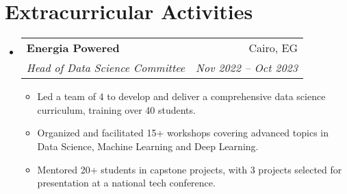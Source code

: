 \documentclass[letterpaper,11pt]{article}
\makeatletter
\newcommand{\resumeItem}[1]{
  \item\small{
    {#1 \vspace{-2pt}}
  }
}
\newcommand{\resumeSubheading}[4]{
  \vspace{-2pt}\item
    \begin{tabular*}{0.97\textwidth}[t]{l@{\extracolsep{\fill}}r}
      \textbf{#1} & #2 \\
      \textit{\small#3} & \textit{\small #4} \\
    \end{tabular*}\vspace{-7pt}
}
\newcommand{\resumeSubHeadingListStart}{\begin{itemize}[leftmargin=0.15in, label={}]}
\newcommand{\resumeSubHeadingListEnd}{\end{itemize}}
\newcommand{\resumeItemListStart}{\begin{itemize}}
\newcommand{\resumeItemListEnd}{\end{itemize}\vspace{-5pt}}
\makeatother
\begin{document}
\section{Extracurricular Activities}
\resumeSubHeadingListStart
\resumeSubheading{Energia Powered }{Cairo, EG}{Head of Data Science Committee}{Nov 2022 -- Oct 2023}
\resumeItemListStart
\resumeItem{Led a team of 4 to develop and deliver a comprehensive data science curriculum, training over 40 students.}
\resumeItem{Organized and facilitated 15+ workshops covering advanced topics in Data Science, Machine Learning and Deep Learning.}
\resumeItem{Mentored 20+ students in capstone projects, with 3 projects selected for presentation at a national tech conference.}
\resumeItemListEnd
\resumeSubHeadingListEnd


\end{document}
